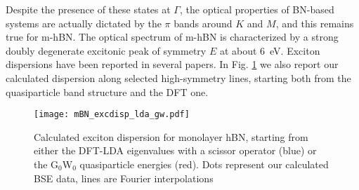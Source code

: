 Despite the presence of these states at $\Gamma$, the optical properties of BN-based systems are actually dictated by the $\pi$ bands around $K$ and $M$, and this remains true for m-hBN.
The optical spectrum of m-hBN is characterized by a strong doubly degenerate excitonic peak of symmetry $E$ at about $6$~eV. Exciton dispersions have been reported in several papers.\cite{koskelo2017excitons,sponza2018direct} In Fig. \ref{fig:mBN_excdisp_lda_gw} we also report our calculated dispersion along selected high-symmetry lines, starting both from the quasiparticle band structure and the DFT one.
\begin{figure}[h!b]
	\vspace{0.2cm}
	\setcapindent{2em}
	\centering
	\texttt{[image: mBN\_excdisp\_lda\_gw.pdf]}
	\caption{Calculated exciton dispersion for monolayer hBN, starting from either the DFT-LDA eigenvalues with a scissor operator (blue) or the G$_0$W$_0$ quasiparticle energies (red). Dots represent our calculated BSE data, lines are Fourier interpolations}
	\label{fig:mBN_excdisp_lda_gw}
\end{figure}

